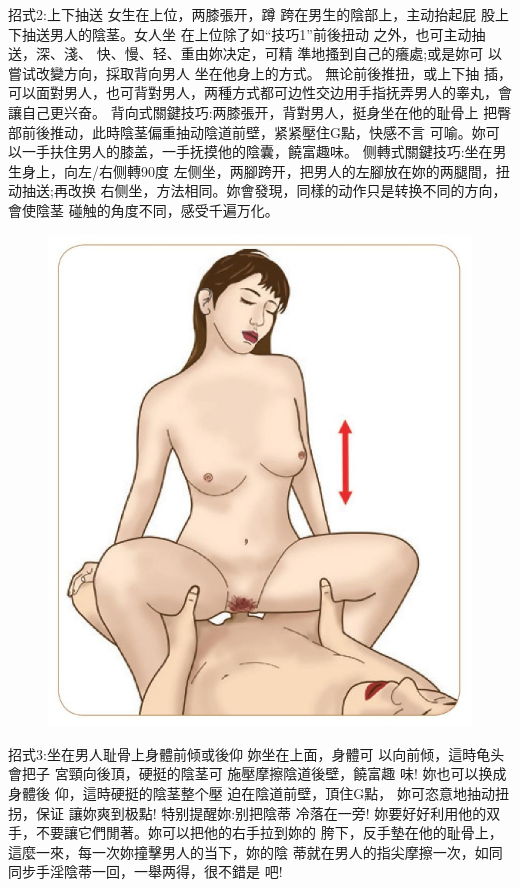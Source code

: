 \documentclass[12pt,UTF8]{ctexbook}
\begin{document}
招式2:上下抽送
女生在上位，两膝張开，蹲
跨在男生的陰部上，主动抬起屁
股上下抽送男人的陰茎。女人坐
在上位除了如“技巧1”前後扭动
之外，也可主动抽送，深、淺、
快、慢、轻、重由妳决定，可精
準地搔到自己的癢處;或是妳可
以嘗试改變方向，採取背向男人
坐在他身上的方式。
無论前後推扭，或上下抽
插，可以面對男人，也可背對男人，两種方式都可边性交边用手指抚弄男人的睾丸，會讓自己更兴奋。
背向式關鍵技巧:两膝張开，背對男人，挺身坐在他的耻骨上
把臀部前後推动，此時陰茎偏重抽动陰道前壁，紧紧壓住G點，快感不言
可喻。妳可以一手扶住男人的膝盖，一手抚摸他的陰囊，饒富趣味。
侧轉式關鍵技巧:坐在男生身上，向左/右侧轉90度
左侧坐，两腳跨开，把男人的左腳放在妳的两腿間，扭动抽送;再改换
右侧坐，方法相同。妳會發現，同樣的动作只是转换不同的方向，會使陰茎
碰触的角度不同，感受千遍万化。

\begin{figure}[htbp]
	\centering
	\includegraphics[width=0.7\linewidth]{25}
	\caption{}
	\label{fig:1}
\end{figure}

招式3:坐在男人耻骨上身體前倾或後仰
妳坐在上面，身體可
以向前倾，這時龟头會把子
宮頸向後頂，硬挺的陰茎可
施壓摩擦陰道後壁，饒富趣
味!
妳也可以换成身體後
仰，這時硬挺的陰茎整个壓
迫在陰道前壁，頂住G點，
妳可恣意地抽动扭拐，保证
讓妳爽到极點!
特别提醒妳:别把陰蒂
冷落在一旁!
妳要好好利用他的双手，不要讓它們閒著。妳可以把他的右手拉到妳的
胯下，反手墊在他的耻骨上，這麼一來，每一次妳撞擊男人的当下，妳的陰
蒂就在男人的指尖摩擦一次，如同同步手淫陰蒂一回，一舉两得，很不錯是
吧!
\end{document}
